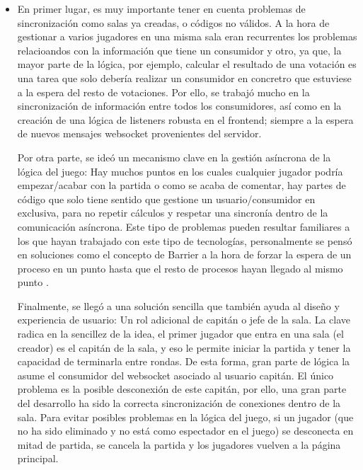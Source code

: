 \begin{itemize}
	\item En primer lugar, es muy importante tener en cuenta problemas de sincronización como salas ya creadas, o códigos no válidos. A la hora de gestionar a varios jugadores en una misma sala
		  eran recurrentes los problemas relacioandos con la información que tiene un consumidor y otro, ya que, la mayor parte de la lógica, por ejemplo, calcular el resultado de una votación
		  es una tarea que solo debería realizar un consumidor en concretro que estuviese a la espera del resto de votaciones. Por ello, se trabajó mucho en la sincronización de información
		  entre todos los consumidores, así como en la creación de una lógica de listeners robusta en el frontend; siempre a la espera de nuevos mensajes websocket provenientes del servidor.
	
		  Por otra parte, se ideó un mecanismo clave en la gestión asíncrona de la lógica del juego: Hay muchos puntos en los cuales cualquier jugador podría empezar/acabar con la partida
		  o como se acaba de comentar, hay partes de código que solo tiene sentido que gestione un usuario/consumidor en exclusiva, para no repetir cálculos y respetar una sincronía dentro
		  de la comunicación asíncrona. Este tipo de problemas pueden resultar familiares a los que hayan trabajado con este tipo de tecnologías, personalmente se pensó en soluciones como el concepto de Barrier
		  a la hora de forzar la espera de un proceso en un punto hasta que el resto de procesos hayan llegado al mismo punto \cite{Barrier}. 
		
		  Finalmente, se llegó a una solución sencilla que también ayuda al diseño y experiencia de usuario: Un rol adicional de capitán o jefe de la sala. La clave radica en la sencillez de la idea, 
		  el primer jugador que entra en una sala (el creador) es el capitán de la sala, y eso le permite iniciar la partida y tener la capacidad de terminarla entre rondas. De esta forma, gran parte de lógica la asume el 
		  consumidor del websocket asociado al usuario capitán. El único problema es la posible desconexión de este capitán, por ello, una gran parte del desarrollo ha sido la correcta sincronización de conexiones dentro 
		  de la sala. Para evitar posibles problemas en la lógica del juego, si un jugador (que no ha sido eliminado y no está como espectador en el juego) se desconecta en mitad de partida, se cancela la partida 
		  y los jugadores vuelven a la página principal.
		

\end{itemize}

